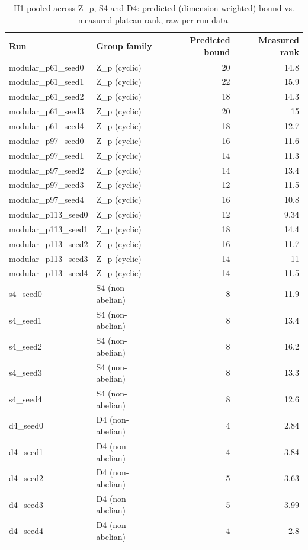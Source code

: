 \begin{table}
\caption{H1 pooled across Z_p, S4 and D4: predicted (dimension-weighted) bound vs. measured plateau rank, raw per-run data.}
\label{tab:h1pooled}
\begin{tabular}{llrr}
\toprule
Run & Group family & Predicted bound & Measured rank \\
\midrule
modular\_p61\_seed0 & Z\_p (cyclic) & 20 & 14.8 \\
modular\_p61\_seed1 & Z\_p (cyclic) & 22 & 15.9 \\
modular\_p61\_seed2 & Z\_p (cyclic) & 18 & 14.3 \\
modular\_p61\_seed3 & Z\_p (cyclic) & 20 & 15 \\
modular\_p61\_seed4 & Z\_p (cyclic) & 18 & 12.7 \\
modular\_p97\_seed0 & Z\_p (cyclic) & 16 & 11.6 \\
modular\_p97\_seed1 & Z\_p (cyclic) & 14 & 11.3 \\
modular\_p97\_seed2 & Z\_p (cyclic) & 14 & 13.4 \\
modular\_p97\_seed3 & Z\_p (cyclic) & 12 & 11.5 \\
modular\_p97\_seed4 & Z\_p (cyclic) & 16 & 10.8 \\
modular\_p113\_seed0 & Z\_p (cyclic) & 12 & 9.34 \\
modular\_p113\_seed1 & Z\_p (cyclic) & 18 & 14.4 \\
modular\_p113\_seed2 & Z\_p (cyclic) & 16 & 11.7 \\
modular\_p113\_seed3 & Z\_p (cyclic) & 14 & 11 \\
modular\_p113\_seed4 & Z\_p (cyclic) & 14 & 11.5 \\
s4\_seed0 & S4 (non-abelian) & 8 & 11.9 \\
s4\_seed1 & S4 (non-abelian) & 8 & 13.4 \\
s4\_seed2 & S4 (non-abelian) & 8 & 16.2 \\
s4\_seed3 & S4 (non-abelian) & 8 & 13.3 \\
s4\_seed4 & S4 (non-abelian) & 8 & 12.6 \\
d4\_seed0 & D4 (non-abelian) & 4 & 2.84 \\
d4\_seed1 & D4 (non-abelian) & 4 & 3.84 \\
d4\_seed2 & D4 (non-abelian) & 5 & 3.63 \\
d4\_seed3 & D4 (non-abelian) & 5 & 3.99 \\
d4\_seed4 & D4 (non-abelian) & 4 & 2.8 \\
\bottomrule
\end{tabular}
\end{table}
